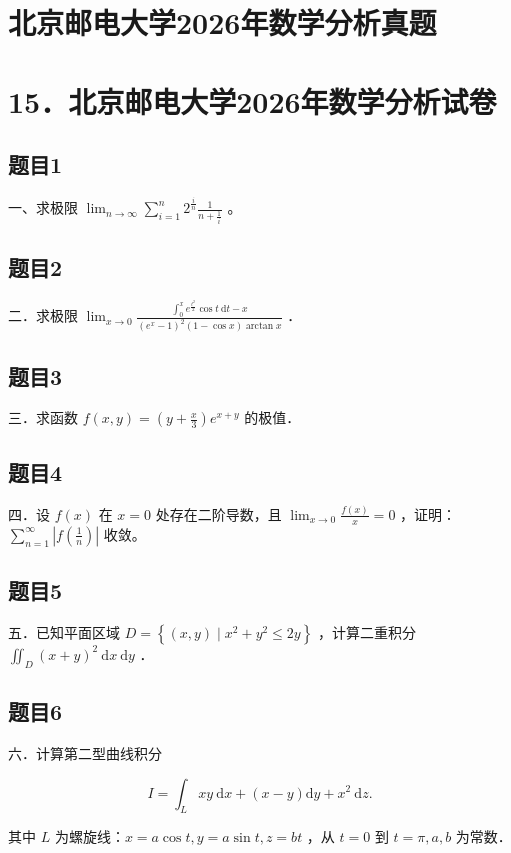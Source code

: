 \documentclass{article}
\begin{document}
\section*{北京邮电大学2026年数学分析真题}
\section*{15．北京邮电大学2026年数学分析试卷}

\subsection{题目1}
一、求极限 \(\lim _{n \rightarrow \infty} \sum_{i=1}^{n} 2^{\frac{i}{n}} \frac{1}{n+\frac{1}{i}}\) 。

\subsection{题目2}
二．求极限 \(\lim _{x \rightarrow 0} \frac{\int_{0}^{x} e^{\frac{t^{2}}{2}} \cos t \mathrm{~d} t-x}{\left(e^{x}-1\right)^{2}(1-\cos x) \arctan x}\) ．

\subsection{题目3}
三．求函数 \(f(x, y)=\left(y+\frac{x}{3}\right) e^{x+y}\) 的极值．

\subsection{题目4}
四．设 \(f(x)\) 在 \(x=0\) 处存在二阶导数，且 \(\lim _{x \rightarrow 0} \frac{f(x)}{x}=0\) ，证明：\(\sum_{n=1}^{\infty}\left|f\left(\frac{1}{n}\right)\right|\) 收敛。

\subsection{题目5}
五．已知平面区域 \(D=\left\{(x, y) \mid x^{2}+y^{2} \leq 2 y\right\}\) ，计算二重积分 \(\iint_{D}(x+y)^{2} \mathrm{~d} x \mathrm{~d} y\) ．

\subsection{题目6}
六．计算第二型曲线积分

\[
I=\int_{L} x y \mathrm{~d} x+(x-y) \mathrm{d} y+x^{2} \mathrm{~d} z .
\]

其中 \(L\) 为螺旋线：\(x=a \cos t, y=a \sin t, z=b t\) ，从 \(t=0\) 到 \(t=\pi, a, b\) 为常数．
\end{document}
